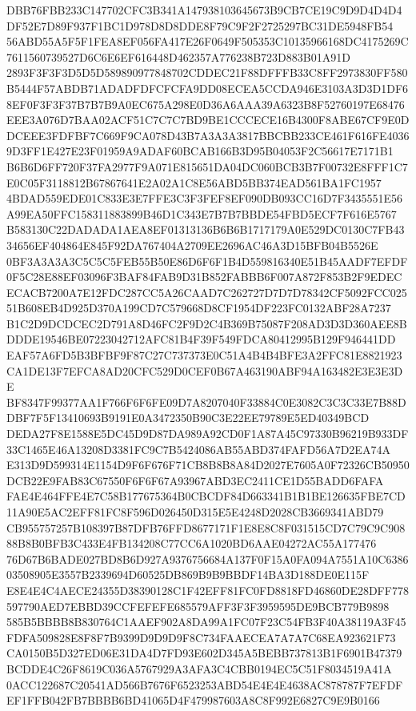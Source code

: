 \documentclass[UTF8,fontset=fandol,zihao=-4,a4paper]{ctexart}
\begin{document}
{{DBB76FBB233C147702CFC3B341A147938103645673B9CB7CE19C9D9D4D4D4DF52E7D89F937F1BC1D978D8D8DDE8F79C9F2F2725297BC31DE5948FB54
56ABD55A5F5F1FEA8EF056FA417E26F0649F505353C10135966168DC4175269C7611560739527D6C6E6EF616448D462357A776238B723D883B01A91D
2893F3F3F3D5D5D589890977848702CDDEC21F88DFFFB33C8FF2973830FF580B5444F57ABDB71ADADFDFCFCFA9DD08ECEA5CCDA946E3103A3D3D1DF6
8EF0F3F3F37B7B7B9A0EC675A298E0D36A6AAA39A6323B8F52760197E68476EEE3A076D7BAA02ACF51C7C7C7BD9BE1CCCECE16B4300F8ABE67CF9E0D
DCEEE3FDFBF7C669F9CA078D43B7A3A3A3817BBCBB233CE461F616FE40369D3FF1E427E23F01959A9ADAF60BCAB166B3D95B04053F2C56617E7171B1
B6B6D6FF720F37FA2977F9A071E815651DA04DC060BCB3B7F00732E8FFF1C7E0C05F3118812B67867641E2A02A1C8E56ABD5BB374EAD561BA1FC1957
4BDAD559EDE01C833E3E7FFE3C3F3FEF8EF090DB093CC16D7F3435551E56A99EA50FFC158311883899B46D1C343E7B7B7BBDE54FBD5ECF7F616E5767
B583130C22DADADA1AEA8EF01313136B6B6B1717179A0E529DC0130C7FB4334656EF404864E845F92DA767404A2709EE2696AC46A3D15BFB04B5526E
0BF3A3A3A3C5C5C5FEB55B50E86D6F6F1B4D559816340E51B45AADF7EFDF0F5C28E88EF03096F3BAF84FAB9D31B852FABBB6F007A872F853B2F9EDEC
ECACB7200A7E12FDC287CC5A26CAAD7C262727D7D7D78342CF5092FCC02551B608EB4D925D370A199CD7C579668D8CF1954DF223FC0132ABF28A7237
B1C2D9DCDCEC2D791A8D46FC2F9D2C4B369B75087F208AD3D3D360AEE8BDDDE19546BE07223042712AFC81B4F39F549FDCA80412995B129F946441DD
EAF57A6FD5B3BFBF9F87C27C737373E0C51A4B4B4BFE3A2FFC81E8821923CA1DE13F7EFCA8AD20CFC529D0CEF0B67A463190ABF94A163482E3E3E3DE
BF8347F99377AA1F766F6F6FE09D7A8207040F33884C0E3082C3C3C33E7B88DDBF7F5F13410693B9191E0A3472350B90C3E22EE79789E5ED40349BCD
DEDA27F8E1588E5DC45D9D87DA989A92CD0F1A87A45C97330B96219B933DF33C1465E46A13208D3381FC9C7B5424086AB55ABD374FAFD56A7D2EA74A
E313D9D599314E1154D9F6F676F71CB8B8B8A84D2027E7605A0F72326CB50950DCB22E9FAB83C67550F6F6F67A93967ABD3EC2411CE1D55BADD6FAFA
FAE4E464FFE4E7C58B177675364B0CBCDF84D663341B1B1BE126635FBE7CD11A90E5AC2EFF81FC8F596D026450D315E5E4248D2028CB3669341ABD79
CB955757257B108397B87DFB76FFD8677171F1E8E8C8F031515CD7C79C9C90888B8B0BFB3C433E4FB134208C77CC6A1020BD6AAE04272AC55A177476
76D67B6BADE027BD8B6D927A9376756684A137F0F15A0FA094A7551A10C638603508905E3557B2339694D60525DB869B9B9BBDF14BA3D188DE0E115F
E8E4E4C4AECE24355D38390128C1F42EFF81FC0FD8818FD46860DE28DFF778597790AED7EBBD39CCFEFEFE685579AFF3F3F3959595DE9BCB779B9898
585B5BBBB8B830764C1AAEF902A8DA99A1FC07F23C54FB3F40A38119A3F45FDFA509828E8F8F7B9399D9D9D9F8C734FAAECEA7A7A7C68EA923621F73
CA0150B5D327ED06E31DA4D7FD93E602D345A5BEBB737813B1F6901B47379BCDDE4C26F8619C036A5767929A3AFA3C4CBB0194EC5C51F8034519A41A
0ACC122687C20541AD566B7676F6523253ABD54E4E4E4638AC878787F7EFDFEF1FFB042FB7BBBB6BD41065D4F479987603A8C8F992E6827C9E9B0166
}}
\end{document}
